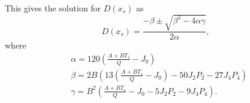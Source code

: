 \documentclass[12pt]{article}
\begin{document}
\clearpage
\noindent
This gives the solution for $D(x_s)$ as
\begin{equation}\label{eq:solution}
D(x_s) = \frac{- \beta \pm \sqrt{\beta^2 - 4\alpha \gamma}}{2\alpha},
\end{equation}
where
\begin{align*}
&\alpha = 120\left( \frac{A+BT_s}{Q} - J_0 \right) \\
&\beta = 2B\left( 13\left( \frac{A+BT_s}{Q} - J_0\right)  - 50J_2P_2 - 27J_4P_4 \right) \\
&\gamma = B^2\left( \frac{A+BT_s}{Q} - J_0 - 5J_2P_2 - 9J_4P_4 \right).
\end{align*}


\end{document}
